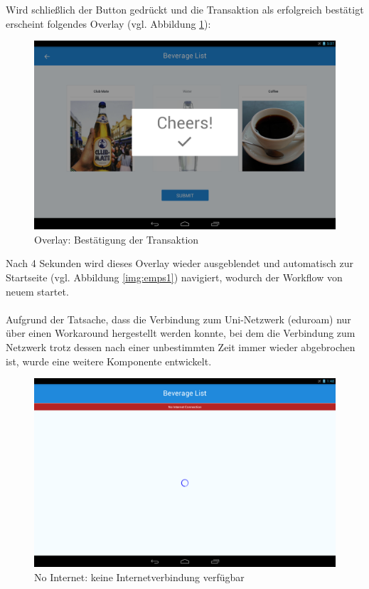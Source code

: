 Wird schließlich der  Button gedrückt und die Transaktion als erfolgreich bestätigt erscheint folgendes Overlay (vgl. Abbildung \ref{img:Overlay}):

\begin{figure}[th!]
	\centering
	\includegraphics[width=.9\columnwidth]{./Abbildungen/Kapitel_03/cheers.png}
	\caption{Overlay: Bestätigung der Transaktion}
	\label{img:Overlay}
\end{figure}

Nach 4 Sekunden wird dieses Overlay wieder ausgeblendet und automatisch zur Startseite (vgl. Abbildung \ref{img:emps1}) navigiert, wodurch der Workflow von neuem startet.\\\\
Aufgrund der Tatsache, dass die Verbindung zum Uni-Netzwerk (eduroam) nur über einen Workaround hergestellt werden konnte, bei dem die Verbindung zum Netzwerk trotz dessen nach einer unbestimmten Zeit immer wieder abgebrochen ist, wurde eine weitere Komponente entwickelt.

\begin{figure}[th!]
	\centering
	\includegraphics[width=.9\columnwidth]{./Abbildungen/Kapitel_03/noconnection.png}
	\caption{No Internet: keine Internetverbindung verfügbar}
	\label{img:drinks2}
\end{figure}

